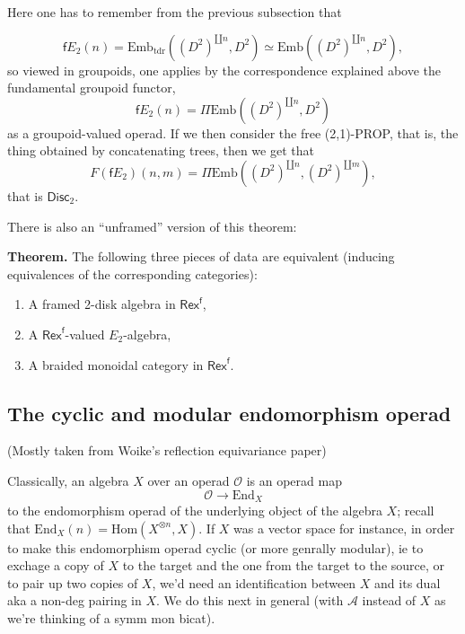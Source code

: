 \documentclass[11pt]{article}
\newcommand{\Rexf}{\mathsf{Rex}^{\mathsf{f}}}
\newcommand{\cA}{\mathcal{A}}
\theoremstyle{definition}
\begin{document}
Here one has to remember from the previous subsection that

$$ \mathsf{f} E_2 (n) =  \text{Emb}_{\text{tdr}} ((D^2)^{\amalg n}, D^2) \simeq \text{Emb} ((D^2)^{\amalg n}, D^2), $$
so viewed in groupoids, one applies by the correspondence explained above the fundamental groupoid functor, 
$$ \mathsf{f} E_2 (n) = \Pi \text{Emb} ((D^2)^{\amalg n}, D^2) $$
as a groupoid-valued operad. If we then consider the free (2,1)-PROP, that is, the thing obtained by concatenating trees, then we get that
$$F( \mathsf{f} E_2) (n,m) = \Pi \text{Emb} ((D^2)^{\amalg n}, (D^2)^{\amalg m}), $$ that is $\mathsf{Disc}_2 $.









There is  also an ``unframed'' version of this theorem:



\noindent \textbf{Theorem.} The following three pieces of data are equivalent (inducing equivalences of the corresponding categories):
\begin{enumerate}
    \item A framed 2-disk algebra in $\Rexf$,
    \item A $\Rexf$-valued $E_2$-algebra,
    \item A braided monoidal category in $\Rexf$.
\end{enumerate}


\subsection{The cyclic and modular endomorphism operad}

(Mostly taken from Woike's reflection equivariance paper)\medskip

Classically, an algebra $X$ over an operad $\mathcal{O}$ is an operad map  $$\mathcal{O} \to \mathrm{End}_X$$ to the endomorphism operad of the underlying object of the algebra $X$; recall that $\mathrm{End}_X(n)= \mathrm{Hom}(X^{\otimes n}, X)$. If $X$ was a vector space for instance, in order to make this endomorphism operad cyclic (or more genrally modular), ie to exchage a copy of $X$ to the target and the one from the target to the source, or to pair up two copies of $X$, we'd need an identification between $X$ and its dual aka a non-deg pairing in $X$. We do this next in general (with $\cA$ instead of $X$ as we're thinking of a symm mon bicat).
\end{document}
